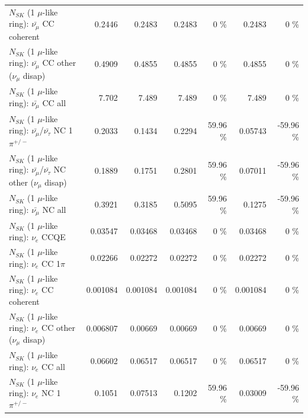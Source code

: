 \begin{table}
\begin{tabular}{| l | r | r | r  r | r  r |}
                       $N_{SK}$ (1 $\mu$-like ring): $\bar{\nu_\mu}$ CC coherent &          0.2446 &          0.2483 &          0.2483 &        0 \%  &          0.2483 &        0 \%  \\ 
        $N_{SK}$ (1 $\mu$-like ring): $\bar{\nu_\mu}$ CC other ($\nu_\mu$ disap) &          0.4909 &          0.4855 &          0.4855 &        0 \%  &          0.4855 &        0 \%  \\ 
                          $N_{SK}$ (1 $\mu$-like ring): $\bar{\nu_{\mu}}$ CC all &           7.702 &           7.489 &           7.489 &        0 \%  &           7.489 &        0 \%  \\ 
\hline
  $N_{SK}$ (1 $\mu$-like ring): $\bar{\nu_\mu}$/$\bar{\nu_\tau}$ NC 1$\pi^{+/-}$ &          0.2033 &          0.1434 &          0.2294 &    59.96 \%  &         0.05743 &   -59.96 \%  \\ 
$N_{SK}$ (1 $\mu$-like ring): $\bar{\nu_\mu}$/$\bar{\nu_\tau}$ NC other ($\nu_\mu$ disap) &          0.1889 &          0.1751 &          0.2801 &    59.96 \%  &         0.07011 &   -59.96 \%  \\ 
                          $N_{SK}$ (1 $\mu$-like ring): $\bar{\nu_{\mu}}$ NC all &          0.3921 &          0.3185 &          0.5095 &    59.96 \%  &          0.1275 &   -59.96 \%  \\ 
\hline
\hline
\hline
                                      $N_{SK}$ (1 $\mu$-like ring): $\nu_e$ CCQE &         0.03547 &         0.03468 &         0.03468 &        0 \%  &         0.03468 &        0 \%  \\ 
                                 $N_{SK}$ (1 $\mu$-like ring): $\nu_e$ CC 1$\pi$ &         0.02266 &         0.02272 &         0.02272 &        0 \%  &         0.02272 &        0 \%  \\ 
                               $N_{SK}$ (1 $\mu$-like ring): $\nu_e$ CC coherent &        0.001084 &        0.001084 &        0.001084 &        0 \%  &        0.001084 &        0 \%  \\ 
                $N_{SK}$ (1 $\mu$-like ring): $\nu_e$ CC other ($\nu_\mu$ disap) &        0.006807 &         0.00669 &         0.00669 &        0 \%  &         0.00669 &        0 \%  \\ 
                                  $N_{SK}$ (1 $\mu$-like ring): $\nu_{e}$ CC all &         0.06602 &         0.06517 &         0.06517 &        0 \%  &         0.06517 &        0 \%  \\ 
\hline
                           $N_{SK}$ (1 $\mu$-like ring): $\nu_e$ NC 1$\pi^{+/-}$ &          0.1051 &         0.07513 &          0.1202 &    59.96 \%  &         0.03009 &   -59.96 \%  \\ 

\end{tabular}
\end{table}
